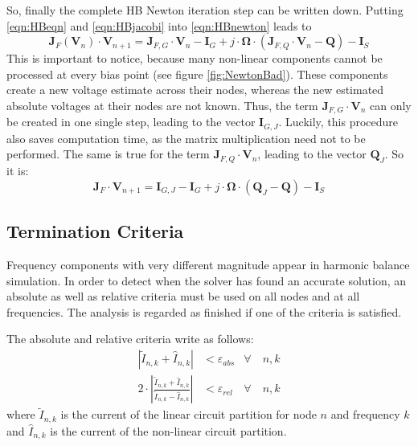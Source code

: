 So, finally the complete HB Newton iteration step can be written down.
Putting \ref{eqn:HBeqn} and \ref{eqn:HBjacobi} into  \ref{eqn:HBnewton}
leads to
\begin{equation}
\textbf{J}_F (\textbf{V}_n) \cdot \textbf{V}_{n+1}
  = \textbf{J}_{F,G} \cdot \textbf{V}_n - \textbf{I}_G +
    j\cdot \boldsymbol{\Omega}\cdot (\textbf{J}_{F,Q}\cdot\textbf{V}_n - \textbf{Q}) -
    \textbf{I}_S
\end{equation}
This is important to notice, because many non-linear components
cannot be processed at every bias point (see figure \ref{fig:NewtonBad}).
These components create a new voltage estimate across their nodes,
whereas the new estimated absolute voltages at their nodes are not
known. Thus, the term $\textbf{J}_{F,G} \cdot \textbf{V}_n$ can
only be created in one single step, leading to the vector
$\textbf{I}_{G,J}$. Luckily, this procedure also saves computation
time, as the matrix multiplication need not to be performed.
The same is true for the term $\textbf{J}_{F,Q}\cdot\textbf{V}_n$,
leading to the vector $\textbf{Q}_J$. So it is:
\begin{equation}
\textbf{J}_F \cdot \textbf{V}_{n+1}
  = \textbf{I}_{G,J} - \textbf{I}_G +
    j\cdot \boldsymbol{\Omega}\cdot (\textbf{Q}_J - \textbf{Q}) -
    \textbf{I}_S
\end{equation}


\subsection{Termination Criteria}

Frequency components with very different magnitude appear in harmonic
balance simulation. In order to detect when the solver has found an
accurate solution, an absolute as well as relative criteria must be
used on all nodes and at all frequencies. The analysis is regarded as
finished if one of the criteria is satisfied.

\addvspace{12pt}

The absolute and relative criteria write as follows:
\begin{align}
\left| \tilde{I}_{n,k} + \hat{I}_{n,k} \right| &< \varepsilon_{abs}
   &\forall \quad n, k\\
2\cdot \left| \frac{\tilde{I}_{n,k} + \hat{I}_{n,k}}
                   {\tilde{I}_{n,k} - \hat{I}_{n,k}} \right|
  &< \varepsilon_{rel}  &\forall \quad n, k
\end{align}
where $\tilde{I}_{n,k}$ is the current of the linear circuit
partition for node $n$ and frequency $k$ and $\hat{I}_{n,k}$
is the current of the non-linear circuit partition.


